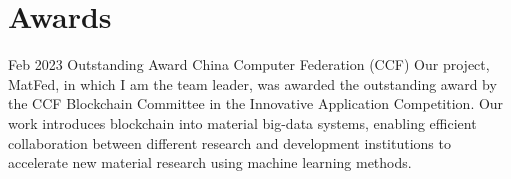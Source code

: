 
    \section{Awards}


		\position
		{Feb 2023}
		{Outstanding Award}
		{China Computer Federation (CCF)}
		{Our project, MatFed, in which I am the team leader, was awarded the outstanding award by the CCF Blockchain Committee in the Innovative Application Competition. Our work introduces blockchain into material big-data systems, enabling efficient collaboration between different research and development institutions to accelerate new material research using machine learning methods.  
		}

        
        
                

